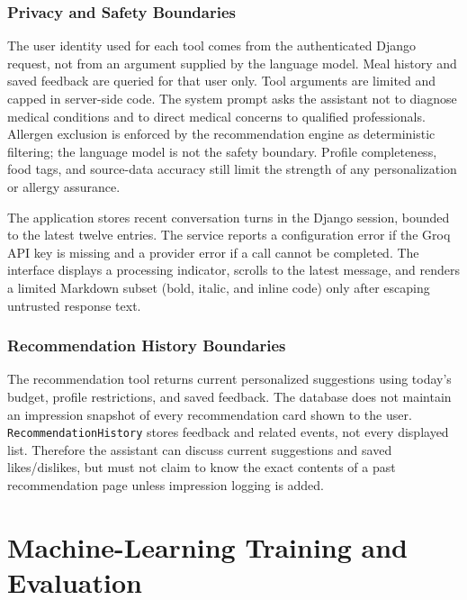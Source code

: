 \documentclass[12pt,a4paper]{report}
\begin{document}
\subsection{Privacy and Safety Boundaries}
The user identity used for each tool comes from the authenticated Django request, not
from an argument supplied by the language model. Meal history and saved feedback are
queried for that user only. Tool arguments are limited and capped in server-side code.
The system prompt asks the assistant not to diagnose medical conditions and to direct
medical concerns to qualified professionals. Allergen exclusion is enforced by the
recommendation engine as deterministic filtering; the language model is not the safety
boundary. Profile completeness, food tags, and source-data accuracy still limit the
strength of any personalization or allergy assurance.

The application stores recent conversation turns in the Django session, bounded to the
latest twelve entries. The service reports a configuration error if the Groq API key is
missing and a provider error if a call cannot be completed. The interface displays a
processing indicator, scrolls to the latest message, and renders a limited Markdown
subset (bold, italic, and inline code) only after escaping untrusted response text.

\subsection{Recommendation History Boundaries}
The recommendation tool returns current personalized suggestions using today's budget,
profile restrictions, and saved feedback. The database does not maintain an impression
snapshot of every recommendation card shown to the user. \texttt{RecommendationHistory}
stores feedback and related events, not every displayed list. Therefore the assistant can
discuss current suggestions and saved likes/dislikes, but must not claim to know the
exact contents of a past recommendation page unless impression logging is added.

\chapter{Machine-Learning Training and Evaluation}
\end{document}

